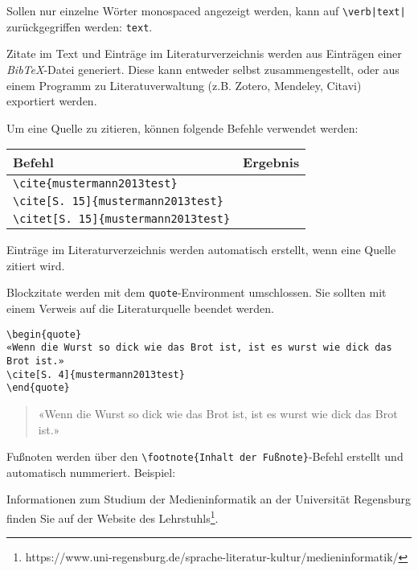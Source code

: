 Sollen nur einzelne Wörter monospaced angezeigt werden, kann auf \verb!\verb|text|! zurückgegriffen werden: \verb|text|.



Zitate im Text und Einträge im Literaturverzeichnis werden aus Einträgen einer \textit{BibTeX}-Datei generiert.
Diese kann entweder selbst zusammengestellt, oder aus einem Programm zu Literatuverwaltung (z.B. Zotero, Mendeley, Citavi) exportiert werden.

Um eine Quelle zu zitieren, können folgende Befehle verwendet werden:

\bigskip

\begin{tabular}{@{}ll@{}}
\hline
\textbf{Befehl} & \textbf{Ergebnis} \\
\hline
    \verb|\cite{mustermann2013test}| & \cite{mustermann2013test} \\
    \verb|\cite[S. 15]{mustermann2013test}| & \cite[S. 15]{mustermann2013test} \\
    \verb|\citet[S. 15]{mustermann2013test}| & \citet[S. 15]{mustermann2013test} \\
\hline
\end{tabular}

\bigskip

Einträge im Literaturverzeichnis werden automatisch erstellt, wenn eine Quelle zitiert wird.


Blockzitate werden mit dem \verb|quote|-Environment umschlossen.
Sie sollten mit einem Verweis auf die Literaturquelle beendet werden.

\begin{verbatim}
\begin{quote}
«Wenn die Wurst so dick wie das Brot ist, ist es wurst wie dick das Brot ist.»
\cite[S. 4]{mustermann2013test}
\end{quote}
\end{verbatim}

\begin{quote}
«Wenn die Wurst so dick wie das Brot ist, ist es wurst wie dick das Brot ist.»
\cite[S. 4]{mustermann2013test}
\end{quote}


Fußnoten werden über den \verb|\footnote{Inhalt der Fußnote}|-Befehl erstellt und automatisch nummeriert. Beispiel:

Informationen zum Studium der Medieninformatik an der Universität Regensburg finden Sie auf der Website des Lehrstuhls\footnote{https://www.uni-regensburg.de/sprache-literatur-kultur/medieninformatik/}.
